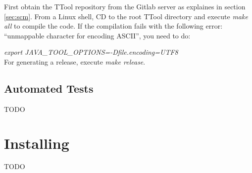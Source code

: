 \documentclass[12pt]{article}
\begin{document}
First obtain the TTool repository from the Gitlab server as explaines in section
\ref{sec:scm}. From a Linux shell, CD to the root TTool directory and execute
\emph{make all} to compile the code. If the compilation fails with the following error:
``unmappable character for encoding ASCII'', you need to do:

\emph{export JAVA\_TOOL\_OPTIONS=-Dfile.encoding=UTF8} \\

For generating a release, execute \emph{make release}.

\subsection{Automated Tests}
TODO

\section{Installing}
TODO
\end{document}
